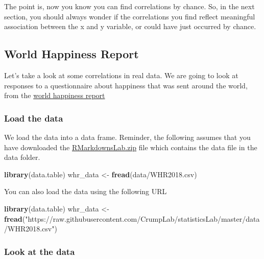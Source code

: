 \documentclass[
]{book}
\newenvironment{Shaded}{\begin{snugshade}}{\end{snugshade}}
\newcommand{\FunctionTok}[1]{\textcolor[rgb]{0.13,0.29,0.53}{\textbf{#1}}}
\newcommand{\NormalTok}[1]{#1}
\newcommand{\OtherTok}[1]{\textcolor[rgb]{0.56,0.35,0.01}{#1}}
\newcommand{\StringTok}[1]{\textcolor[rgb]{0.31,0.60,0.02}{#1}}
\begin{document}
The point is, now you know you can find correlations by chance. So, in the next section, you should always wonder if the correlations you find reflect meaningful association between the x and y variable, or could have just occurred by chance.

\hypertarget{world-happiness-report}{%
\subsection{World Happiness Report}\label{world-happiness-report}}

Let's take a look at some correlations in real data. We are going to look at responses to a questionnaire about happiness that was sent around the world, from the \href{http://worldhappiness.report}{world happiness report}

\hypertarget{load-the-data-1}{%
\subsubsection{Load the data}\label{load-the-data-1}}

We load the data into a data frame. Reminder, the following assumes that you have downloaded the \href{https://github.com/CrumpLab/statisticsLab/raw/master/RMarkdownsLab.zip}{RMarkdownsLab.zip} file which contains the data file in the data folder.

\begin{Shaded}
\begin{Highlighting}[]
\FunctionTok{library}\NormalTok{(data.table)}
\NormalTok{whr\_data }\OtherTok{\textless{}{-}} \FunctionTok{fread}\NormalTok{(}\StringTok{\textquotesingle{}data/WHR2018.csv\textquotesingle{}}\NormalTok{)}
\end{Highlighting}
\end{Shaded}

You can also load the data using the following URL

\begin{Shaded}
\begin{Highlighting}[]
\FunctionTok{library}\NormalTok{(data.table)}
\NormalTok{whr\_data }\OtherTok{\textless{}{-}} \FunctionTok{fread}\NormalTok{(}\StringTok{"https://raw.githubusercontent.com/CrumpLab/statisticsLab/master/data/WHR2018.csv"}\NormalTok{)}
\end{Highlighting}
\end{Shaded}

\hypertarget{look-at-the-data-1}{%
\subsubsection{Look at the data}\label{look-at-the-data-1}}
\end{document}
